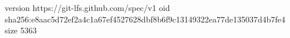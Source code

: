 version https://git-lfs.github.com/spec/v1
oid sha256:e8aac5d72ef2a4c1a67ef4527628dbf8b6f9c13149322ea77de135037d4b7fe4
size 5363

